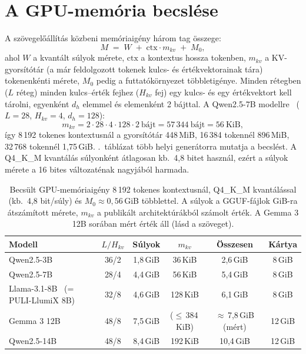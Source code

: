 \section{A GPU-memória becslése}
\label{app-vram}

A szövegelőállítás közbeni memóriaigény három tag összege:
\begin{equation}
M \;=\; W \;+\; \mathrm{ctx}\cdot m_{kv} \;+\; M_0,
\label{eq:vram}
\end{equation}
ahol $W$ a kvantált súlyok mérete, $\mathrm{ctx}$ a kontextus hossza tokenben, $m_{kv}$ a
KV-gyorsítótár (a már feldolgozott tokenek kulcs- és értékvektorainak tára) tokenenkénti mérete, $M_0$
pedig a futtatókörnyezet többletigénye. Minden rétegben ($L$ réteg) minden kulcs--érték fejhez ($H_{kv}$
fej) egy kulcs- és egy értékvektort kell tárolni, egyenként $d_h$ elemmel és elemenként 2 bájttal. A
Qwen2.5-7B modellre~\cite{qwen25} ($L=28$, $H_{kv}=4$, $d_h=128$):
\begin{equation*}
m_{kv}=2\cdot 28\cdot 4\cdot 128\cdot 2\ \text{bájt}=57\,344\ \text{bájt}= 56\ \text{KiB},
\end{equation*}
így 8\,192 tokenes kontextusnál a gyorsítótár 448\,MiB, 16\,384 tokennél 896\,MiB, 32\,768 tokennél
1,75\,GiB. \Az{\ref{tab:budget}}.~táblázat több helyi generátorra mutatja a becslést. A Q4\_K\_M
kvantálás súlyonként átlagosan kb.\ 4,8 bitet használ, ezért a súlyok mérete a 16 bites változaténak
nagyjából harmada.

\begin{table}[htbp]
\centering
\caption[Becsült GPU-memóriaigény (8\,192 tokenes kontextus, Q4\_K\_M kvantálás).]{Becsült
GPU-memóriaigény 8\,192 tokenes kontextusnál, Q4\_K\_M kvantálással (kb.\ 4,8 bit/súly) és
$M_0\approx0{,}56$\,GiB többlettel. A súlyok a GGUF-fájlok GiB-ra átszámított mérete, $m_{kv}$ a
publikált architektúrákból számolt érték. A Gemma 3 12B sorában mért érték áll (lásd a szöveget).}
\label{tab:budget}
\small
\setlength{\tabcolsep}{4pt}
\begin{tabular}{@{}lccccc@{}}
\toprule
Modell & $L/H_{kv}$ & Súlyok & $m_{kv}$ & Összesen & Kártya \\
\midrule
Qwen2.5-3B  & 36/2 & 1,8\,GiB & 36\,KiB  & 2,6\,GiB  & 8\,GiB \\
Qwen2.5-7B  & 28/4 & 4,4\,GiB & 56\,KiB  & 5,4\,GiB  & 8\,GiB \\
Llama-3.1-8B~\cite{grattafiori2024llama3} (= PULI-LlumiX 8B) & 32/8 & 4,6\,GiB & 128\,KiB & 6,1\,GiB & 8\,GiB \\
Gemma 3 12B~\cite{gemma3} & 48/8 & 7,5\,GiB & ($\le$\,384\,KiB) & $\approx$\,7,8\,GiB (mért) & 12\,GiB \\
Qwen2.5-14B & 48/8 & 8,4\,GiB & 192\,KiB & 10,4\,GiB & 12\,GiB \\
\bottomrule
\end{tabular}
\end{table}

